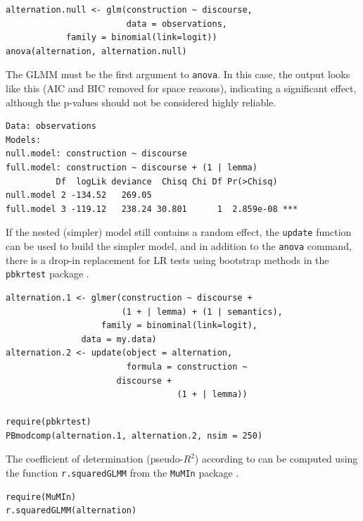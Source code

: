 \documentclass[a4paper,12pt]{article}
\begin{document}
\begin{lstlisting}
alternation.null <- glm(construction ~ discourse,
                        data = observations,
			family = binomial(link=logit))
anova(alternation, alternation.null)
\end{lstlisting}

The GLMM must be the first argument to \texttt{anova}.
In this case, the output looks like this (AIC and BIC removed for space reasons), indicating a significant effect, although the p-values should not be considered highly reliable.

\vspace{0.5\baselineskip}

\begin{lstlisting}
Data: observations
Models:
null.model: construction ~ discourse
full.model: construction ~ discourse + (1 | lemma)
          Df  logLik deviance  Chisq Chi Df Pr(>Chisq)    
null.model 2 -134.52   269.05                             
full.model 3 -119.12   238.24 30.801      1  2.859e-08 ***
\end{lstlisting}

If the nested (simpler) model still contains a random effect, the \texttt{update} function can be used to build the simpler model, and in addition to the \texttt{anova} command, there is a drop-in replacement for LR tests using bootstrap methods in the \texttt{pbkrtest} package \citep{HalekohHojsgaard2014}.

\vspace{0.5\baselineskip}

\begin{lstlisting}
alternation.1 <- glmer(construction ~ discourse +
                       (1 + | lemma) + (1 | semantics),
	               family = binominal(link=logit),
		       data = my.data)
alternation.2 <- update(object = alternation,
                        formula = construction ~
			          discourse +
                                  (1 + | lemma))

require(pbkrtest)
PBmodcomp(alternation.1, alternation.2, nsim = 250)
\end{lstlisting}

The coefficient of determination (pseudo-$R^2$) according to \citet{NakagawaSchielzeth2013} can be computed using the function \texttt{r.squaredGLMM} from the \texttt{MuMIn} package \citep{Barton2016}.

\vspace{0.5\baselineskip}

\begin{lstlisting}
require(MuMIn)
r.squaredGLMM(alternation)
\end{lstlisting}
\end{document}
